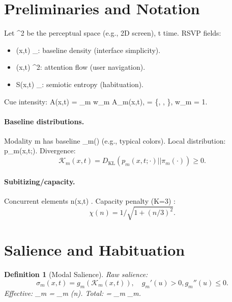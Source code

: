 \documentclass[openany]{book}
\newtheorem{definition}{Definition}[chapter]
\begin{document}
\section{Preliminaries and Notation}
\label{sec:rsvp-prelim}
Let \Omega \subset {}^2 be the perceptual space (e.g., 2D screen), t  time. RSVP fields:
\begin{itemize}
  \item \Phi(x,t) \in {}_{}: baseline density (interface simplicity).
  \item {}(x,t) \in {}^2: attention flow (user navigation).
  \item S(x,t) \in {}_{}: semiotic entropy (habituation).
\end{itemize}
Cue intensity: A(x,t) = \sum_{m \in {}} w_m A_m(x,t),  = \{, , \}, w_m = 1.

\paragraph{Baseline distributions.}
Modality m has baseline \pi_m(\xi) (e.g., typical colors). Local distribution: p_m(x,t;\xi). Divergence:
\begin{equation}
\label{eq:KL}
\mathcal{K}_m(x,t) = D_{\mathrm{KL}}(p_m(x,t;\cdot) || \pi_m(\cdot)) \geq 0.
\end{equation}

\paragraph{Subitizing/capacity.}
Concurrent elements n(x,t) \in {}. Capacity penalty (K=3) \citep{kaufman1949}:
\begin{equation}
\label{eq:capacity}
\chi(n) = 1 / \sqrt{1 + (n/3)^2}.
\end{equation}

\section{Salience and Habituation}
\label{sec:rsvp-salience}

\begin{definition}[Modal Salience]
Raw salience:
\begin{equation}
\label{eq:raw-salience}
\sigma_m(x,t) = g_m(\mathcal{K}_m(x,t)), \quad g_m'(u)>0, g_m''(u)\leq 0.
\end{equation}
Effective: \widehat{\sigma}_m = \sigma_m \chi(n). Total: \widehat{\sigma} = \sum_m \widehat{\sigma}_m.
\end{definition}
\end{document}
